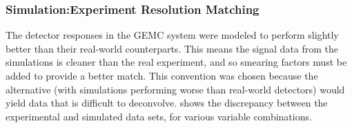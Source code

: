 \subsubsection{Simulation:Experiment Resolution Matching}\label{sec:momsmear}

The detector responses in the GEMC system were modeled to perform slightly better than their real-world counterparts. This means the signal data from the simulations is cleaner than the real experiment, and so smearing factors must be added to provide a better match. This convention was chosen because the alternative (with simulations performing worse than real-world detectors) would yield data that is difficult to deconvolve.  shows the discrepancy between the experimental and simulated data sets, for various variable combinations. 

